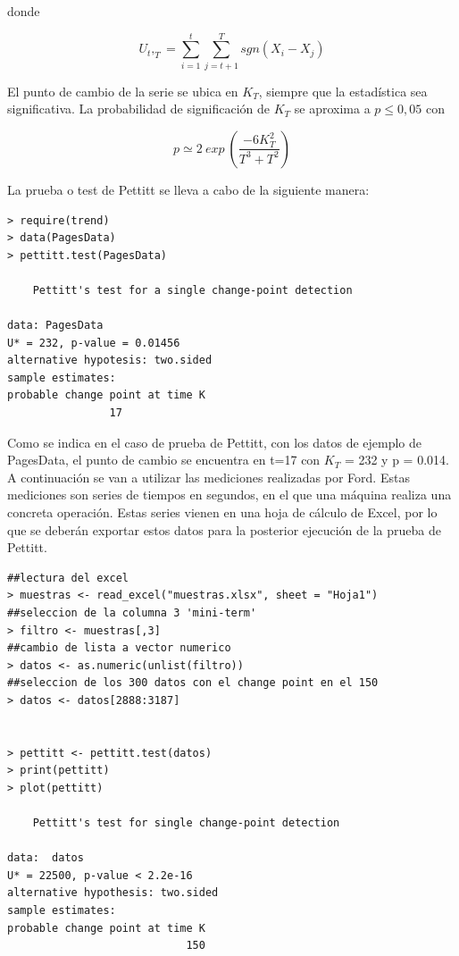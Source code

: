 \documentclass[runningheads,a4paper,12pt]{report}
\begin{document}
donde

\begin{equation}
{U_t,_T} = \sum_{i=1}^{t} \sum_{j=t+1}^{T} sgn({X_i-X_j})
\end{equation}

El punto de cambio de la serie se ubica en $K_T$, siempre que la estadística sea significativa. La probabilidad de significación de $K_T$ se aproxima a $p\leq0,05$ con

\begin{equation}
p \simeq 2\ exp\ \left(\frac{-6K^2_T}{T^3+T^2}\right) 
\end{equation}

La prueba o test de Pettitt se lleva a cabo de la siguiente manera:
\begin{lstlisting}
> require(trend)
> data(PagesData)
> pettitt.test(PagesData)

	Pettitt's test for a single change-point detection

data: PagesData
U* = 232, p-value = 0.01456
alternative hypotesis: two.sided
sample estimates:
probable change point at time K
				17
\end{lstlisting}

Como se indica en el caso de prueba de Pettitt, con los datos de ejemplo de PagesData, el punto de cambio se encuentra en t=17 con $K_T$ = 232 y p = 0.014.\\
\newpage
A continuación se van a utilizar las mediciones realizadas por Ford. Estas mediciones son series de tiempos en segundos, en el que una máquina realiza una concreta operación. Estas series vienen en una hoja de cálculo de Excel, por lo que se deberán exportar estos datos para la posterior ejecución de la prueba de Pettitt.\\

\begin{lstlisting}
##lectura del excel
> muestras <- read_excel("muestras.xlsx", sheet = "Hoja1")
##seleccion de la columna 3 'mini-term'
> filtro <- muestras[,3]
##cambio de lista a vector numerico
> datos <- as.numeric(unlist(filtro))
##seleccion de los 300 datos con el change point en el 150
> datos <- datos[2888:3187]


> pettitt <- pettitt.test(datos)
> print(pettitt)
> plot(pettitt)

	Pettitt's test for single change-point detection

data:  datos
U* = 22500, p-value < 2.2e-16
alternative hypothesis: two.sided
sample estimates:
probable change point at time K 
                            150 

\end{lstlisting}
\end{document}
